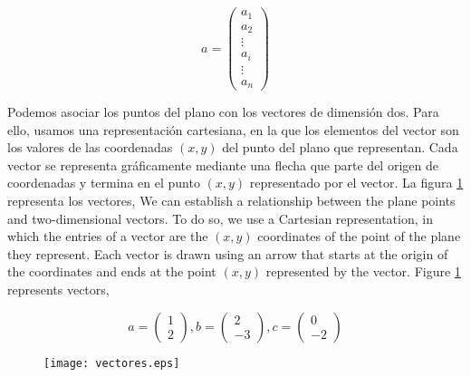 \begin{equation*}
a=
\begin{pmatrix}
a_1\\
a_2\\
\vdots \\
a_i\\
\vdots \\
a_n
\end{pmatrix}
\end{equation*}
\begin{paracol}{2}
Podemos asociar los puntos del plano con los vectores de dimensión dos. Para ello, usamos una representación cartesiana, en la que los elementos del vector son los valores de las coordenadas $(x,y)$ del punto del plano que representan. Cada vector se representa gráficamente mediante una flecha que parte del origen de coordenadas y termina en el punto $(x,y)$ representado por el vector. La figura \ref{fig:vectores} representa los vectores,
\switchcolumn
We can establish a relationship between the plane points and two-dimensional vectors. To do so, we use a Cartesian representation, in which the entries of a vector are the $(x,y)$ coordinates of the point of the plane they represent. Each vector is drawn using an arrow that starts at the origin of the coordinates and ends at the point $(x,y)$ represented by the vector. Figure \ref{fig:vectores} represents vectors, 
\end{paracol}
\begin{equation*}
a=
\begin{pmatrix}
1\\
2
\end{pmatrix},
b=
\begin{pmatrix}
2\\
-3
\end{pmatrix},
c=
\begin{pmatrix}
0\\
-2
\end{pmatrix}
\end{equation*}


\begin{figure}[h]
\centering
\texttt{[image: vectores.eps]}
\label{fig:vectores}
\end{figure}

